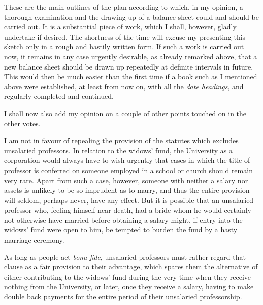These are the main outlines of the plan according to which, in my opinion, a thorough examination and the drawing up of a balance sheet could and should be carried out. It is a substantial piece of work, which I shall, however, gladly undertake if desired. The shortness of the time will excuse my presenting this sketch only in a rough and hastily written form. If such a work is carried out now, it remains in any case urgently desirable, as already remarked above, that a new balance sheet should be drawn up repeatedly at definite intervals in future. This would then be much easier than the first time if a book such as I mentioned above were established, at least from now on, with all the \textit{date headings}, and regularly completed and continued.

I shall now also add my opinion on a couple of other points touched on in the other votes.

I am not in favour of repealing the provision of the statutes which excludes unsalaried professors. In relation to the widows' fund, the University as a corporation would always have to wish urgently that cases in which the title of professor is conferred on someone employed in a school or church should remain very rare. Apart from such a case, however, someone with neither a salary nor assets is unlikely to be so imprudent as to marry, and thus the entire provision will seldom, perhaps never, have any effect. But it is possible that an unsalaried professor who, feeling himself near death, had a bride whom he would certainly not otherwise have married before obtaining a salary might, if entry into the widows' fund were open to him, be tempted to burden the fund by a hasty marriage ceremony.

As long as people act \textit{bona fide}, unsalaried professors must rather regard that clause as
a fair provision to their advantage, which spares them the alternative of either contributing to the widows' fund during the very time when they receive nothing from the University, or later, once they receive a salary, having to make double back payments for the entire period of their unsalaried professorship.

